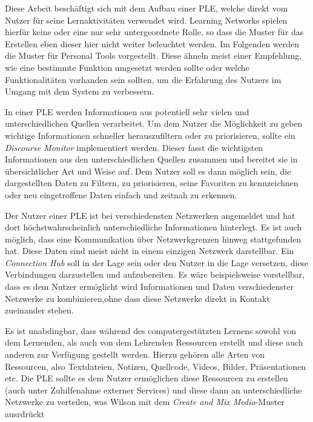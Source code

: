 Diese Arbeit beschäftigt sich mit dem Aufbau einer PLE, welche direkt vom Nutzer für seine Lernaktivitäten verwendet wird. Learning Networks spielen hierfür keine oder eine nur sehr untergeordnete Rolle, so dass die Muster für das Erstellen eben dieser hier nicht weiter beleuchtet werden. Im Folgenden werden die Muster für Personal Tools vorgestellt. Diese ähneln meist einer Empfehlung, wie eine bestimmte Funktion umgesetzt werden sollte oder welche Funktionalitäten vorhanden sein sollten, um die Erfahrung des Nutzers im Umgang mit dem System zu verbessern.

In einer PLE werden Informationen aus potentiell sehr vielen und unterschiedlichen Quellen verarbeitet. Um dem Nutzer die Möglichkeit zu geben wichtige Informationen schneller herauszufiltern oder zu priorisieren, sollte ein \emph{Discourse Monitor} implementiert werden. Dieser fasst die wichtigsten Informationen aus den unterschiedlichen Quellen zusammen und bereitet sie in übersichtlicher Art und Weise auf. Dem Nutzer soll es dann möglich sein, die dargestellten Daten zu Filtern, zu priorisieren, seine Favoriten zu kennzeichnen oder neu eingetroffene Daten einfach und zeitnah zu erkennen. 

Der Nutzer einer PLE ist bei verschiedensten Netzwerken angemeldet und hat dort höchstwahrscheinlich unterschiedliche Informationen hinterlegt. Es ist auch möglich, dass eine Kommunikation über Netzwerkgrenzen hinweg stattgefunden hat. Diese Daten sind meist nicht in einem einzigen Netzwerk darstellbar. Ein \emph{Connection Hub} soll in der Lage sein oder den Nutzer in die Lage versetzen, diese Verbindungen darzustellen und aufzubereiten. Es wäre beispielsweise vorstellbar, dass es dem Nutzer ermöglicht wird Informationen und Daten verschiedenster Netzwerke zu kombinieren,ohne dass diese Netzwerke direkt in Kontakt zueinander stehen.

Es ist unabdingbar, dass während des computergestützten Lernens sowohl von dem Lernenden, als auch von dem Lehrenden Ressourcen erstellt und diese auch anderen zur Verfügung gestellt werden. Hierzu gehören alle Arten von Ressourcen, also Textdateien, Notizen, Quellcode, Videos, Bilder, Präsentationen etc. Die PLE sollte es dem Nutzer ermöglichen diese Ressourcen zu erstellen (auch unter Zuhilfenahme externer Services) und diese dann an unterschiedliche Netzwerke zu verteilen, was Wilson mit dem \emph{Create and Mix Media}-Muster ausrdrückt

